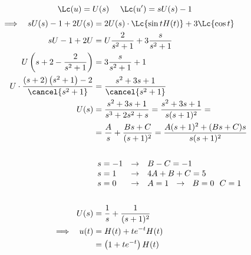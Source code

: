 \Soluzione

\begin{equation*}
\Lc(u) = U(s) \ \ \ \ \Lc(u') = sU(s) - 1
\end{equation*}
\begin{align*}
\implies \ \ sU(s) - 1 + 2U(s) & = 2U(s) \cdot \Lc\{\sin tH(t)\} + 3\Lc\{\cos t\}\\
sU - 1 + 2U & = U\frac{2}{s^{2} + 1} + 3\frac{s}{s^{2} + 1}\\
U\left(s + 2 - \frac{2}{s^{2} + 1}\right) & = 3\frac{s}{s^{2} + 1} + 1\\
U \cdot \frac{(s + 2)\left(s^{2} + 1\right) - 2}{\cancel{s^{2} + 1}} & = \frac{s^{2} + 3s + 1}{\cancel{s^{2} + 1}}\\
U(s) & = \frac{s^{2} + 3s + 1}{s^{3} + 2s^{2} + s} = \frac{s^{2} + 3s + 1}{s(s + 1)^{2}} = \\
 & = \frac{A}{s} + \frac{Bs + C}{(s + 1)^{2}} = \frac{A(s + 1)^{2} + (Bs + C) s}{s(s + 1)^{2}}\\
 & \\
 &
\begin{array}{l c l}
s = -1 & \rightarrow & B - C = -1\\
s = 1 & \rightarrow & 4A + B + C = 5\\
s = 0 & \rightarrow & A = 1\ \ \rightarrow \ \ B = 0\ \ C = 1
\end{array}\\
 & \ \ \ \ \\
U(s) & = \frac{1}{s} + \frac{1}{(s + 1)^{2}}\\
\implies \ \ u(t) & = H(t) + te^{- t} H(t)\\
 & = \left(1 + te^{- t}\right) H(t)
\end{align*}

\Soluzione

